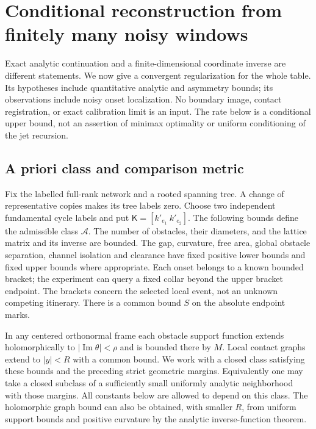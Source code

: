\section{Conditional reconstruction from finitely many noisy windows}
\label{sec:stable}
Exact analytic continuation and a finite-dimensional coordinate inverse
are different statements. We now give a convergent regularization for
the whole table. Its hypotheses include quantitative analytic and
asymmetry bounds; its observations include noisy onset localization.
No boundary image, contact registration, or exact calibration limit is
an input. The rate below is a conditional upper bound, not an assertion
of minimax optimality or uniform conditioning of the jet recursion.

\subsection{A priori class and comparison metric}
Fix the labelled full-rank network and a rooted spanning tree. A change
of representative copies makes its tree labels zero. Choose two
independent fundamental cycle labels and put
$\mathsf K=[k'_{e_1}\ k'_{e_2}]$. The following bounds define the
admissible class $\mathcal A$.
The number of obstacles, their diameters, and the lattice matrix and its
inverse are bounded. The gap, curvature, free area, global obstacle separation, channel
isolation and clearance have fixed positive lower bounds and fixed upper bounds
where appropriate. Each onset belongs to a known bounded bracket; the
experiment can query a fixed collar beyond the upper bracket endpoint.
The brackets concern the selected local event, not an unknown competing
itinerary. There is a common bound $S$ on the absolute endpoint marks.

In any centered orthonormal frame each obstacle support function extends
holomorphically to $|\operatorname{Im}\theta|<\rho$ and is bounded there
by $M$. Local contact graphs extend to $|y|<R$ with a common bound.
We work with a closed class satisfying these bounds and the preceding
strict geometric margins. Equivalently one may take a closed subclass
of a sufficiently small uniformly analytic neighborhood with those
margins. All constants below are allowed to depend on this class. The
holomorphic graph bound can also be obtained, with smaller $R$, from
uniform support bounds and positive curvature by the analytic
inverse-function theorem.

